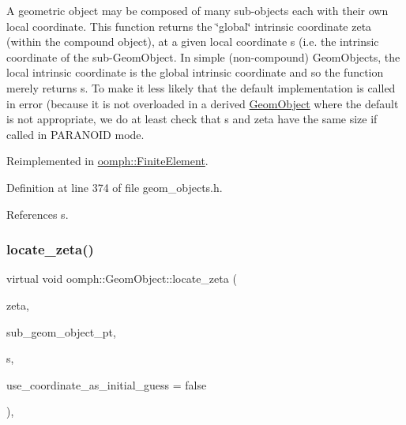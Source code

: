 A geometric object may be composed of many sub-\/objects each with their own local coordinate. This function returns the \char`\"{}global\char`\"{} intrinsic coordinate zeta (within the compound object), at a given local coordinate s (i.\+e. the intrinsic coordinate of the sub-\/\+Geom\+Object. In simple (non-\/compound) Geom\+Objects, the local intrinsic coordinate is the global intrinsic coordinate and so the function merely returns s. To make it less likely that the default implementation is called in error (because it is not overloaded in a derived \hyperlink{classoomph_1_1GeomObject}{Geom\+Object} where the default is not appropriate, we do at least check that s and zeta have the same size if called in P\+A\+R\+A\+N\+O\+ID mode. 



Reimplemented in \hyperlink{classoomph_1_1FiniteElement_a4407a4f0fb5bf5b883530742ee3153df}{oomph\+::\+Finite\+Element}.



Definition at line 374 of file geom\+\_\+objects.\+h.



References s.

\mbox{\label{classoomph_1_1GeomObject_a78ee9f98bcfd0c5e1f07a459777663d3}} 
\subsubsection{\texorpdfstring{locate\+\_\+zeta()}{locate\_zeta()}}
{\footnotesize\ttfamily virtual void oomph\+::\+Geom\+Object\+::locate\+\_\+zeta (\begin{DoxyParamCaption}\item[{const \hyperlink{classoomph_1_1Vector}{Vector}$<$ double $>$ \&}]{zeta,  }\item[{\hyperlink{classoomph_1_1GeomObject}{Geom\+Object} $\ast$\&}]{sub\+\_\+geom\+\_\+object\+\_\+pt,  }\item[{\hyperlink{classoomph_1_1Vector}{Vector}$<$ double $>$ \&}]{s,  }\item[{const bool \&}]{use\+\_\+coordinate\+\_\+as\+\_\+initial\+\_\+guess = {\ttfamily false} }\end{DoxyParamCaption})\hspace{0.3cm}{\ttfamily [inline]}, {\ttfamily [virtual]}}



